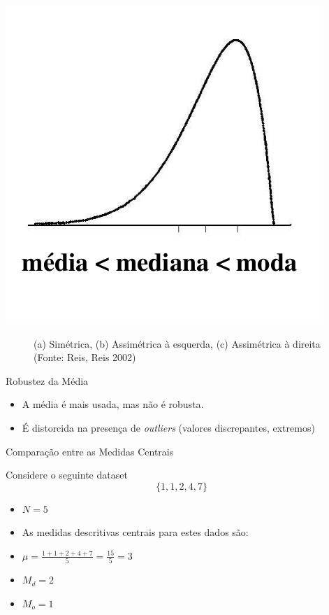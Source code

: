 \documentclass{beamer}
\begin{document}
\begin{frame}
    \includegraphics[height=0.4\textheight]{medidas3}
\begin{figure}
  \caption{(a) Simétrica, (b) Assimétrica à esquerda, (c) Assimétrica
    à direita (Fonte: Reis, Reis 2002)}
\end{figure}
\end{frame}

\begin{frame}{Robustez da Média}
  \begin{itemize}
  \item<1> A média é mais usada, mas não é \alert{robusta}.
  \item<1> É distorcida na presença de {\it outliers} (valores
    discrepantes, extremos)
  \end{itemize}
  
\end{frame}
\begin{frame}{Comparação entre as Medidas Centrais}
  \begin{Example}Considere o seguinte dataset $$\{ 1,1,2,4,7\}$$
  \begin{itemize}
  \item $N=5$
  \item As medidas descritivas centrais para estes dados são:
  \item $\mu = \frac{1+1+2+4+7}{5} = \frac{15}{5}= 3$
  \item $M_d = 2$
  \item $M_o = 1$
  \end{itemize}
\end{Example}
\end{frame}
\end{document}
